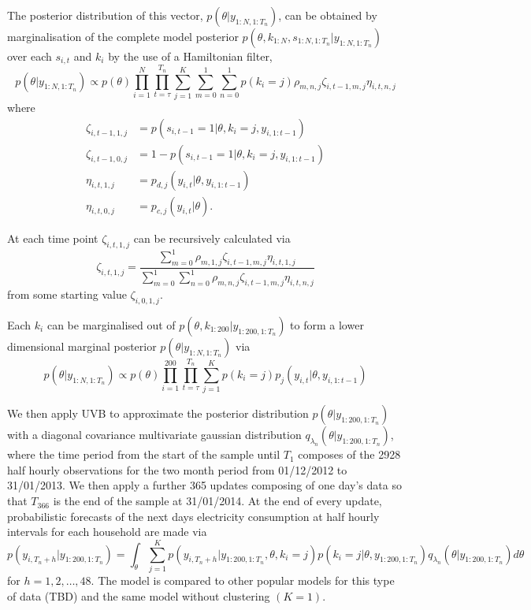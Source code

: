 \documentclass[12pt,a4paper]{article}\usepackage[]{graphicx}\usepackage[]{color}
\begin{document}
The posterior distribution of this vector, $p(\theta | y_{1:N, 1:T_n})$, can be obtained by marginalisation of the complete model posterior $p(\theta, k_{1:N}, s_{1:N, 1:T_n} | y_{1:N, 1:T_n})$ over each $s_{i, t}$ and $k_i$ by the use of a Hamiltonian filter,
\begin{equation}
p(\theta | y_{1:N, 1:T_n}) \propto p(\theta)  \prod_{i=1}^N \prod_{t=\tau}^{T_n}\sum_{j=1}^K \sum_{m=0}^1 \sum_{n=0}^1 p(k_i = j) \rho_{m, n, j} \zeta_{i, t-1, m, j} \eta_{i, t, n, j}
\end{equation}
where
\begin{align}
\zeta_{i, t-1, 1, j} &= p(s_{i, t-1} = 1 | \theta, k_i = j, y_{i, 1:t-1}) \\
\zeta_{i, t-1, 0, j} &= 1 - p(s_{i, t-1} = 1 | \theta, k_i = j, y_{i, 1:t-1}) \\
\eta_{i, t, 1, j} &= p_{d, j}(y_{i, t} | \theta, y_{i, 1:t-1}) \\
\eta_{i, t, 0, j} &= p_{c, j}(y_{i, t} | \theta).
\end{align}

At each time point $\zeta_{i, t, 1, j}$ can be recursively calculated via
\begin{equation}
\zeta_{i, t, 1, j} = \frac{\sum_{m=0}^1 \rho_{m, 1, j} \zeta_{i, t-1, m, j} \eta_{i, t, 1, j}}{\sum_{m=0}^1 \sum_{n=0}^1 \rho_{m, n, j} \zeta_{i, t-1, m, j} \eta_{i, t, n, j}}
\end{equation}
from some starting value $\zeta_{i, 0, 1, j}$.
\fi


Each $k_i$ can be marginalised out of $p(\theta, k_{1:200} | y_{1:200, 1:T_n})$ to form a lower dimensional marginal posterior $p(\theta | y_{1:N, 1:T_n})$ via
\begin{equation}
p(\theta | y_{1:N, 1:T_n}) \propto p(\theta)  \prod_{i=1}^200 \prod_{t=\tau}^{T_n}\sum_{j=1}^K p(k_i = j)p_{j}(y_{i, t} | \theta, y_{i, 1:t-1})
\end{equation}

We then apply UVB to approximate the posterior distribution $p(\theta | y_{1:200, 1:T_n})$ with a diagonal covariance multivariate gaussian distribution $q_{\lambda_n}(\theta | y_{1:200, 1:T_n})$, where the time period from the start of the sample until $T_1$ composes of the 2928 half hourly observations for the two month period from 01/12/2012 to 31/01/2013. We then apply a further 365 updates composing of one day's data so that $T_366$ is the end of the sample at 31/01/2014. At the end of every update, probabilistic forecasts of the next days electricity consumption at half hourly intervals for each household are made via
\begin{equation}
p(y_{i, T_n+h} | y_{1:200, 1:T_n}) = \int_{\theta} \sum_{j=1}^K p(y_{i, T_n+h} | y_{1:200, 1:T_n}, \theta, k_i = j) p(k_i = j | \theta, y_{1:200, 1:T_n}) q_{\lambda_n}(\theta | y_{1:200, 1:T_n}) d\theta
\end{equation}
for $h = 1, 2, \dots, 48$.
The model is compared to other popular models for this type of data (TBD) and the same model without clustering $(K = 1)$.



\end{document}
